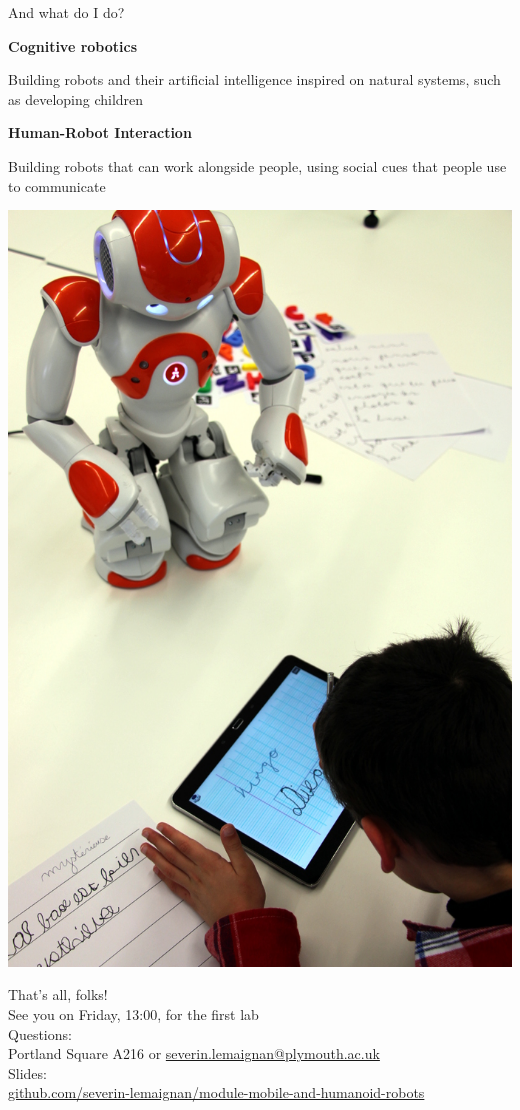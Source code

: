 \documentclass[compress]{beamer}
\begin{document}
\begin{frame}{And what do I do?}

\begin{multicols}{2}

    \textbf{Cognitive robotics}

  Building robots and their artificial intelligence inspired on natural
  systems, such as developing children

    \textbf{Human-Robot Interaction}

  Building robots that can work alongside people, using social cues that
  people use to communicate

    \begin{center}
        \includegraphics[width=0.8\linewidth]{cowriter}
    \end{center}

\end{multicols}
\end{frame}


\begin{frame}{}
    \begin{center}
        \Large
        That's all, folks!\\[2em]
        \normalsize
        See you on Friday, 13:00, for the first lab\\[1em]
        Questions:\\
        Portland Square A216 or \url{severin.lemaignan@plymouth.ac.uk} \\[1em]

        Slides:\\ \href{https://github.com/severin-lemaignan/module-mobile-and-humanoid-robots}{\small github.com/severin-lemaignan/module-mobile-and-humanoid-robots}

    \end{center}
\end{frame}
\end{document}
